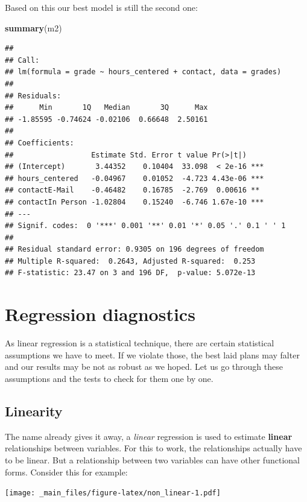 \documentclass[
]{book}
\newenvironment{Shaded}{\begin{snugshade}}{\end{snugshade}}
\newcommand{\FunctionTok}[1]{\textcolor[rgb]{0.13,0.29,0.53}{\textbf{#1}}}
\newcommand{\NormalTok}[1]{#1}
\begin{document}
Based on this our best model is still the second one:

\begin{Shaded}
\begin{Highlighting}[]
\FunctionTok{summary}\NormalTok{(m2)}
\end{Highlighting}
\end{Shaded}

\begin{verbatim}
## 
## Call:
## lm(formula = grade ~ hours_centered + contact, data = grades)
## 
## Residuals:
##      Min       1Q   Median       3Q      Max 
## -1.85595 -0.74624 -0.02106  0.66648  2.50161 
## 
## Coefficients:
##                  Estimate Std. Error t value Pr(>|t|)    
## (Intercept)       3.44352    0.10404  33.098  < 2e-16 ***
## hours_centered   -0.04967    0.01052  -4.723 4.43e-06 ***
## contactE-Mail    -0.46482    0.16785  -2.769  0.00616 ** 
## contactIn Person -1.02804    0.15240  -6.746 1.67e-10 ***
## ---
## Signif. codes:  0 '***' 0.001 '**' 0.01 '*' 0.05 '.' 0.1 ' ' 1
## 
## Residual standard error: 0.9305 on 196 degrees of freedom
## Multiple R-squared:  0.2643, Adjusted R-squared:  0.253 
## F-statistic: 23.47 on 3 and 196 DF,  p-value: 5.072e-13
\end{verbatim}

\hypertarget{regression-diagnostics}{%
\section{Regression diagnostics}\label{regression-diagnostics}}

As linear regression is a statistical technique, there are certain statistical
assumptions we have to meet. If we violate those, the best laid plans may
falter and our results may be not as robust as we hoped.
Let us go through these assumptions and the tests to check for them one by one.

\hypertarget{linearity}{%
\subsection{Linearity}\label{linearity}}

The name already gives it away, a \emph{linear} regression is used to estimate
\textbf{linear} relationships between variables. For this to work, the relationships
actually have to be linear. But a relationship between two variables can have
other functional forms. Consider this for example:

\texttt{[image: \_main\_files/figure-latex/non\_linear-1.pdf]}
\end{document}
